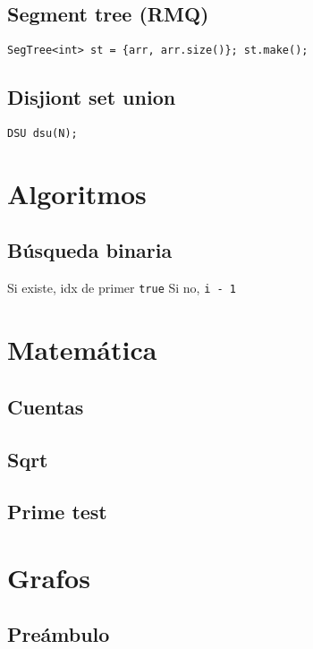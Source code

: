    \subsection{Segment tree (RMQ)}
        \texttt{SegTree<int> st = \{arr, arr.size()\}; st.make();}

    \subsection{Disjiont set union}
        \texttt{DSU dsu(N);}


\section{Algoritmos}
    \subsection{Búsqueda binaria}
        Si existe, idx de primer \texttt{true}
        Si no, \texttt{i - 1}


\section{Matemática}
    \subsection{Cuentas}

    \subsection{Sqrt}

    \subsection{Prime test}
        
\section{Grafos}
    \subsection{Preámbulo}
        
